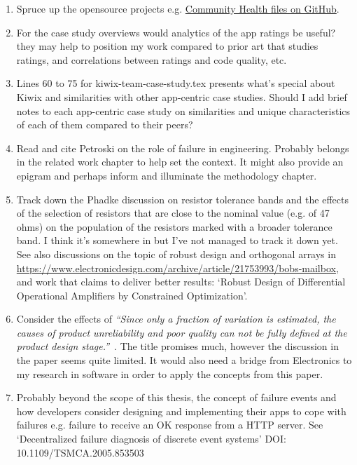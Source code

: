 \begin{enumerate}
    \item Spruce up the opensource projects e.g. \href{https://docs.github.com/en/communities/setting-up-your-project-for-healthy-contributions/creating-a-default-community-health-file}{Community Health files on GitHub}.
    
    \item For the case study overviews would analytics of the app ratings be useful? they may help to position my work compared to prior art that studies ratings, and correlations between ratings and code quality, etc.
    
    \item Lines 60 to 75 for kiwix-team-case-study.tex presents what's special about Kiwix and similarities with other app-centric case studies. Should I add brief notes to each app-centric case study on similarities and unique characteristics of each of them compared to their peers?
    
    \item Read and cite Petroski on the role of failure in engineering. Probably belongs in the related work chapter to help set the context. It might also provide an epigram and perhaps inform and illuminate the methodology chapter.
    
    \item Track down the Phadke discussion on resistor tolerance bands and the effects of the selection of resistors that are close to the nominal value (e.g. of 47 ohms) on the population of the resistors marked with a broader tolerance band. I think it's somewhere in \citep{phadke1995_quality_engineering_using_robust_design} but I've not managed to track it down yet. See also discussions on the topic of robust design and orthogonal arrays in \url{https://www.electronicdesign.com/archive/article/21753993/bobs-mailbox}, and work that claims to deliver better results: `Robust Design of Differential Operational Amplifiers by Constrained Optimization'.
    
    \item Consider the effects of \emph{``Since only a fraction of variation is estimated, the causes of product unreliability and poor quality can not be fully deﬁned at the product design stage.''}~\citep{lulu2003_analytically_unobservable_failure_events}. The title promises much, however the discussion in the paper seems quite limited. It would also need a bridge from Electronics to my research in software in order to apply the concepts from this paper.
    
    \item Probably beyond the scope of this thesis, the concept of failure events and how developers consider designing and implementing their apps to cope with failures e.g. failure to receive an OK response from a HTTP server. See `Decentralized failure diagnosis of discrete event systems' DOI: 10.1109/TSMCA.2005.853503
    

\end{enumerate}
